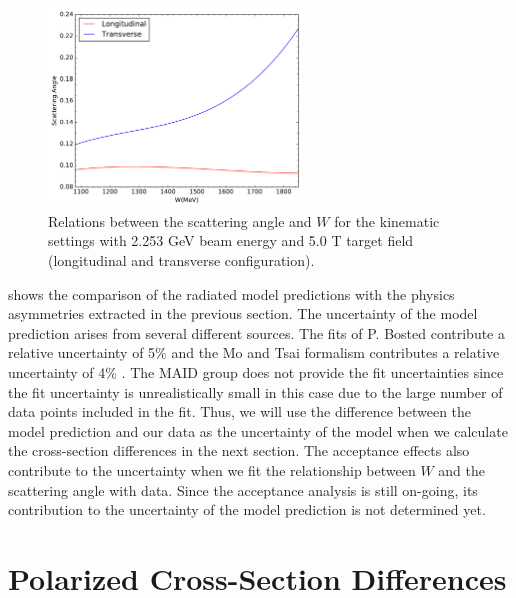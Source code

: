 \begin{figure}[tb!]
  \centering
  \includegraphics[width=0.6\textwidth]{figs/scattering-angle.pdf}
  \caption[Relations between the scattering angle and $W$.]{Relations between the scattering angle and $W$ for the kinematic settings with 2.253 GeV beam energy and 5.0 T target field (longitudinal and transverse configuration). \label{C8S2F7}}
\end{figure}

 shows the comparison of the radiated model predictions with the physics asymmetries extracted in the previous section. The uncertainty of the model prediction arises from several different sources. The fits of P. Bosted contribute a relative uncertainty of 5\% \cite{Bosted2008} and the Mo and Tsai formalism contributes a relative uncertainty of 4\% \cite{Mo1969}. The MAID group does not provide the fit uncertainties since the fit uncertainty is unrealistically small in this case due to the large number of data points included in the fit. Thus, we will use the difference between the model prediction and our data as the uncertainty of the model when we calculate the cross-section differences in the next section. The acceptance effects also contribute to the uncertainty when we fit the relationship between $W$ and the scattering angle with data. Since the acceptance analysis is still on-going, its contribution to the uncertainty of the model prediction is not determined yet.

\section{Polarized Cross-Section Differences}
\label{C8S3}

